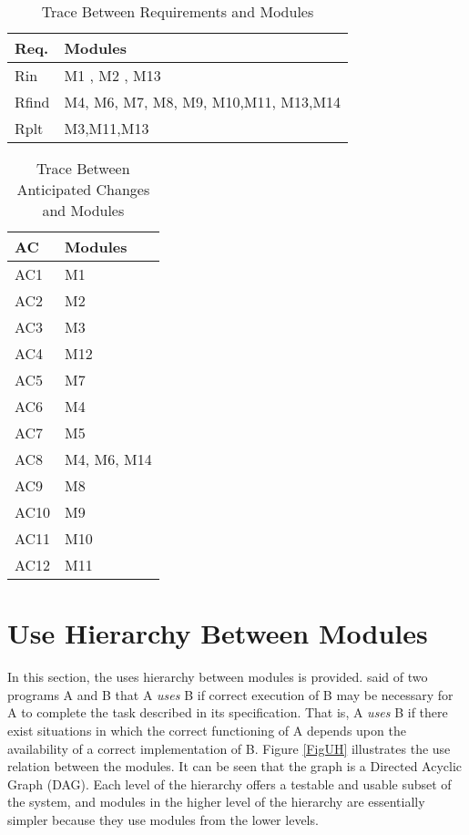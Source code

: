 \documentclass[12pt, titlepage]{article}
\begin{document}
	\begin{table}[H]
		\centering
		\begin{tabular}{p{} p{}}
			\toprule
			\textbf{Req.} & \textbf{Modules}\\
			\midrule
			Rin & M1 , M2 , M13\\
			Rfind & M4, M6, M7, M8, M9, M10,M11, M13,M14\\
			Rplt & M3,M11,M13 \\
			\bottomrule
		\end{tabular}
		\caption{Trace Between Requirements and Modules}
		\label{TblRT}
	\end{table}
	
	\begin{table}[H]
		\centering
		\begin{tabular}{p{} p{}}
			\toprule
			\textbf{AC} & \textbf{Modules}\\
			\midrule
			AC1 & M1\\
			AC2 & M2\\
			AC3 & M3\\
			AC4 & M12\\
			AC5 & M7\\ 
			AC6 & M4\\ 
			AC7 & M5\\ 
			AC8 & M4, M6, M14\\ 
			AC9 & M8\\ 
			AC10 & M9\\
			AC11 & M10\\ 
			AC12 & M11\\
			\bottomrule
		\end{tabular}
		\caption{Trace Between Anticipated Changes and Modules}
		\label{TblACT}
	\end{table}
	
	\section{Use Hierarchy Between Modules} \label{SecUse}
	
	In this section, the uses hierarchy between modules is
	provided. \citet{Parnas1978} said of two programs A and B that A {\em uses} 
	B if
	correct execution of B may be necessary for A to complete the task 
	described in
	its specification. That is, A {\em uses} B if there exist situations in 
	which
	the correct functioning of A depends upon the availability of a correct
	implementation of B.  Figure \ref{FigUH} illustrates the use relation 
	between
	the modules. It can be seen that the graph is a Directed Acyclic Graph
	(DAG). Each level of the hierarchy offers a testable and usable subset of 
	the
	system, and modules in the higher level of the hierarchy are essentially 
	simpler
	because they use modules from the lower levels. \\
	
\end{document}
